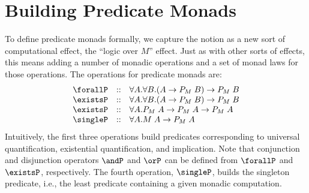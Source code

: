 \documentclass[preprint]{sigplanconf}
\begin{document}
\section{Building Predicate Monads}

To define predicate monads formally, we capture the notion as a new sort of
computational effect, the ``logic over $M$'' effect. Just as with other sorts of
effects, this means adding a number of monadic operations and a set of monad
laws for those operations. The operations for predicate monads are:
\[
\begin{array}{lcl}
  \forallP & :: & \forall A.\forall B.(A\to P_M\;B) \to P_M\;B\\
  \existsP & :: & \forall A.\forall B.(A\to P_M\;B) \to P_M\;B\\
  \existsP & :: & \forall A.P_M\;A \to P_M\;A \to P_M\;A\\
  \singleP & :: & \forall A.M\;A \to P_M\;A\\
\end{array}
\]
Intuitively, the first three operations build predicates corresponding to
universal quantification, existential quantification, and implication. Note that
conjunction and disjunction operators $\andP$ and $\orP$ can be defined from
$\forallP$ and $\existsP$, respectively.  The fourth operation, $\singleP$,
builds the singleton predicate, i.e., the least predicate containing a given
monadic computation.
\end{document}
